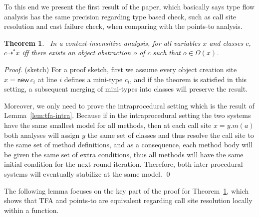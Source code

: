 \documentclass[runningheads]{llncs}
\newtheorem{Theorem}{Theorem}
\newcommand{\keyword}[1]{\mathsf{#1}}
\newcommand{\kwnew}[0]{\keyword{new}}
\newcommand{\VPT}{\Omega}
\newcommand{\Class}{\mathcal{C}}
\newcommand{\Field}{\mathcal{F}}
\newcommand{\tflow}{\dashrightarrow}
\newcommand{\hflow}{\longrightarrow}
\newcommand{\lhflow}[1]{\stackrel{#1}{\hflow}}
\newcommand\set[1]{\{#1\}}
\newcommand\power{\mathcal{P}}
\begin{document}
To this end we present the first result of the paper, which basically says type flow analysis has the same precision regarding type based check, such as call site resolution and cast failure check, when comparing with the points-to analysis.
\begin{Theorem}~\label{thm:tfa}
  In a context-insensitive analysis, for all variables $x$ and classes $c$, $c\tflow^*x$ iff there exists an object abstraction $o$ of $c$ such that $o\in\VPT(x)$.
\end{Theorem}
\begin{proof} (sketch)
For a proof sketch, first we assume every object creation site $x = \kwnew\ c_i$ at line $i$ defines a mini-type $c_i$, and if the theorem is satisfied in this setting, a subsequent merging of mini-types into classes will preserve the result.

Moreover, we only need to prove the intraprocedural setting which is the result of Lemma~\ref{lem:tfa-intra}. Because if in the intraprocedural setting the two systems have the same smallest model for all methods, then at each call site $x=y.m(a)$ both analyses will assign $y$ the same set of classes and thus resolve the call site to the same set of method definitions, and as a consequence, each method body will be given the same set of extra conditions, thus all methods will have the same initial condition for the next round iteration. Therefore, both inter-procedural systems will eventually stabilize at the same model. \qed
\end{proof}


The following lemma focuses on the key part of the proof for Theorem~\ref{thm:tfa}, which shows that TFA and points-to are equivalent regarding call site resolution locally within a function.
\end{document}
